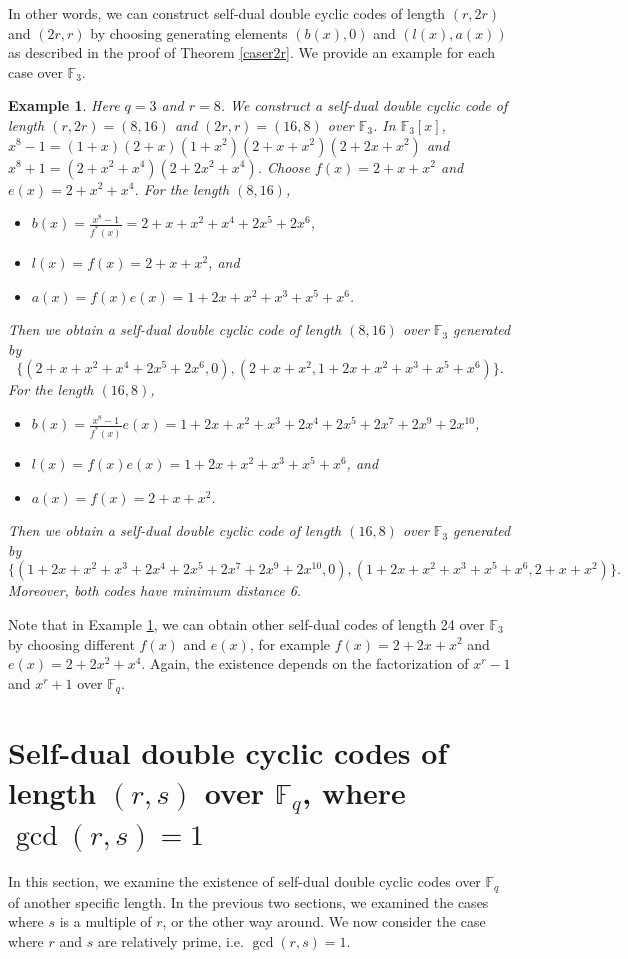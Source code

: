 \documentclass[12pt]{article}
\newtheorem{example}[theorem]{Example}
\begin{document}
	In other words, we can construct self-dual double cyclic codes of length $(r,2r)$ and $(2r,r)$ by choosing generating elements $(b(x),0)$ and $(l(x),a(x))$ as described in the proof of Theorem \ref{caser2r}. We provide an example for each case over $\mathbb{F}_3$.
	\begin{example}\label{exr2r}
		Here $q=3$ and $r=8$. We construct a self-dual double cyclic code of length $(r,2r)=(8,16)$ and $(2r,r)=(16,8)$ over $\mathbb{F}_3$. In $\mathbb{F}_3[x]$, $x^8-1=(1+x)(2+x)(1+x^2)(2+x+x^2)(2+2x+x^2)$ and $x^8+1=(2+x^2+x^4)(2+2x^2+x^4)$. Choose $f(x)=2+x+x^2$ and $e(x)=2+x^2+x^4$.
		For the length $(8,16)$,
		\begin{itemize}
			\item $b(x)=\frac{x^8-1}{f^{*}(x)}=2+x+x^2+x^4+2x^5+2x^6$,
			\item $l(x)=f(x)=2+x+x^2$, and
			\item $a(x)=f(x)e(x)=1+2x+x^2+x^3+x^5+x^6$.
		\end{itemize}
		Then we obtain a self-dual double cyclic code of length $(8,16)$ over $\mathbb{F}_3$ generated by $$\{(2+x+x^2+x^4+2x^5+2x^6,0),(2+x+x^2,1+2x+x^2+x^3+x^5+x^6)\}.$$
		For the length $(16,8)$,
		\begin{itemize}
			\item $b(x)=\frac{x^8-1}{f^{*}(x)}e(x)=1+2x+x^2+x^3+2x^4+2x^5+2x^7+2x^9+2x^{10}$,
			\item $l(x)=f(x)e(x)=1+2x+x^2+x^3+x^5+x^6$, and
			\item $a(x)=f(x)=2+x+x^2$.
		\end{itemize}
		Then we obtain a self-dual double cyclic code of length $(16,8)$ over $\mathbb{F}_3$ generated by $$\{(1+2x+x^2+x^3+2x^4+2x^5+2x^7+2x^9+2x^{10},0),(1+2x+x^2+x^3+x^5+x^6,2+x+x^2)\}.$$
		Moreover, both codes have minimum distance 6.
	\end{example}
	Note that in Example \ref{exr2r}, we can obtain other self-dual codes of length 24 over $\mathbb{F}_3$ by choosing different $f(x)$ and $e(x)$, for example $f(x)=2+2x+x^2$ and $e(x)=2+2x^2+x^4$. Again, the existence depends on the factorization of $x^r-1$ and $x^r+1$ over $\mathbb{F}_q$.
	
	\section{Self-dual double cyclic codes of length $(r,s)$ over $\mathbb{F}_{q}$, where $\gcd(r,s)=1$}
	In this section, we examine the existence of self-dual double cyclic codes over $\mathbb{F}_q$ of another specific length. In the previous two sections, we examined the cases where $s$ is a multiple of $r$, or the other way around. We now consider the case where $r$ and $s$ are relatively prime, i.e. $\gcd(r,s)=1$.
	
\end{document}
